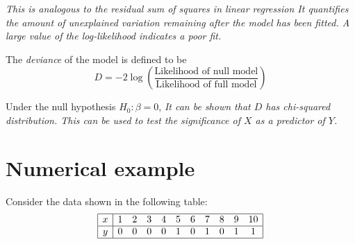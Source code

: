 %

%
%
%
%

\bit
\it This is analogous to the residual sum of squares in linear regression
\it It quantifies the amount of unexplained variation remaining after the model has been fitted.
\it A large value of the log-likelihood indicates a poor fit.
\eit


The \emph{deviance} of the model is defined to be
\[
D = -2\log\left(\frac{\text{Likelihood of null model}}{\text{Likelihood of full model}}\right)
\]

Under the null hypothesis $H_0:\beta=0$,
\bit
\it It can be shown that $D$ has chi-squared distribution.
\it This can be used to test the significance of $X$ as a predictor of $Y$.
\eit


\section{Numerical example}
Consider the data shown in the following table:
\[
\begin{array}{|c|cccccccccc|}\hline
x	& 1 & 2 & 3 & 4 & 5 & 6 & 7 & 8 & 9 & 10 \\ \hline
y	& 0 & 0 & 0 & 0 & 1 & 0 & 1 & 0 & 1 & 1 \\ \hline
\end{array}
\]	

